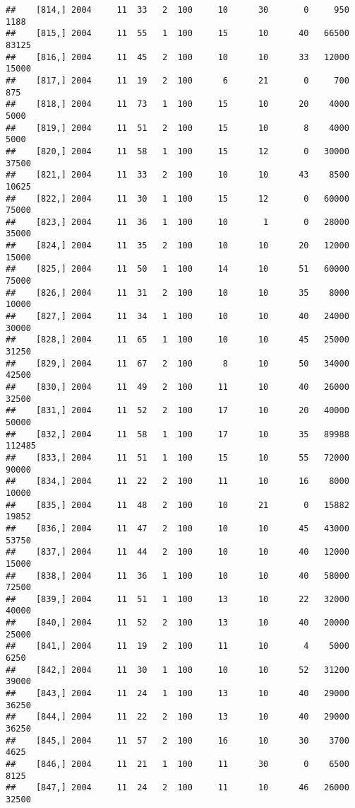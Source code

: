 \documentclass{article}\usepackage[]{graphicx}\usepackage[]{color}
\makeatletter
\newenvironment{kframe}{%
 \def\at@end@of@kframe{}%
 \ifinner\ifhmode%
  \def\at@end@of@kframe{\end{minipage}}%
  \begin{minipage}{\columnwidth}%
 \fi\fi%
 \def\FrameCommand##1{\hskip\@totalleftmargin \hskip-\fboxsep
 \colorbox{shadecolor}{##1}\hskip-\fboxsep
     \hskip-\linewidth \hskip-\@totalleftmargin \hskip\columnwidth}%
 \MakeFramed {\advance\hsize-\width
   \@totalleftmargin\z@ \linewidth\hsize
   \@setminipage}}%
 {\par\unskip\endMakeFramed%
 \at@end@of@kframe}
\newenvironment{knitrout}{}{} %
\makeatother
\begin{document}
\begin{knitrout}
\begin{kframe}
\begin{verbatim}
##    [814,] 2004     11  33   2  100     10      30       0     950    1188
##    [815,] 2004     11  55   1  100     15      10      40   66500   83125
##    [816,] 2004     11  45   2  100     10      10      33   12000   15000
##    [817,] 2004     11  19   2  100      6      21       0     700     875
##    [818,] 2004     11  73   1  100     15      10      20    4000    5000
##    [819,] 2004     11  51   2  100     15      10       8    4000    5000
##    [820,] 2004     11  58   1  100     15      12       0   30000   37500
##    [821,] 2004     11  33   2  100     10      10      43    8500   10625
##    [822,] 2004     11  30   1  100     15      12       0   60000   75000
##    [823,] 2004     11  36   1  100     10       1       0   28000   35000
##    [824,] 2004     11  35   2  100     10      10      20   12000   15000
##    [825,] 2004     11  50   1  100     14      10      51   60000   75000
##    [826,] 2004     11  31   2  100     10      10      35    8000   10000
##    [827,] 2004     11  34   1  100     10      10      40   24000   30000
##    [828,] 2004     11  65   1  100     10      10      45   25000   31250
##    [829,] 2004     11  67   2  100      8      10      50   34000   42500
##    [830,] 2004     11  49   2  100     11      10      40   26000   32500
##    [831,] 2004     11  52   2  100     17      10      20   40000   50000
##    [832,] 2004     11  58   1  100     17      10      35   89988  112485
##    [833,] 2004     11  51   1  100     15      10      55   72000   90000
##    [834,] 2004     11  22   2  100     11      10      16    8000   10000
##    [835,] 2004     11  48   2  100     10      21       0   15882   19852
##    [836,] 2004     11  47   2  100     10      10      45   43000   53750
##    [837,] 2004     11  44   2  100     10      10      40   12000   15000
##    [838,] 2004     11  36   1  100     10      10      40   58000   72500
##    [839,] 2004     11  51   1  100     13      10      22   32000   40000
##    [840,] 2004     11  52   2  100     13      10      40   20000   25000
##    [841,] 2004     11  19   2  100     11      10       4    5000    6250
##    [842,] 2004     11  30   1  100     10      10      52   31200   39000
##    [843,] 2004     11  24   1  100     13      10      40   29000   36250
##    [844,] 2004     11  22   2  100     13      10      40   29000   36250
##    [845,] 2004     11  57   2  100     16      10      30    3700    4625
##    [846,] 2004     11  21   1  100     11      30       0    6500    8125
##    [847,] 2004     11  24   2  100     11      10      46   26000   32500

\end{verbatim}
\end{kframe}
\end{knitrout}
\end{document}
